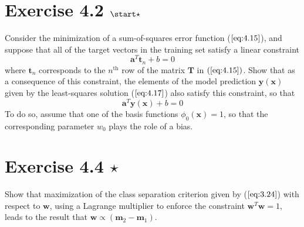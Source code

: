 \section*{Exercise 4.2 $\start \star$}
Consider the minimization of a sum-of-squares error
function ($\ref{eq:4.15}$), and suppose that all of the 
target vectors in the training set satisfy a linear constraint
\begin{equation}\label{eq:4.157}\tag{4.157}
    \mathbf{a}^T\mathbf{t}_n + b = 0
\end{equation}
where $\mathbf{t}_n$ corresponds to the $n^\text{th}$ row of the matrix $\mathbf{T}$
in $(\ref{eq:4.15})$. Show that as a consequence of this constraint,
the elements of the model prediction $\mathbf{y}(\mathbf{x})$ given
by the least-squares solution ($\ref{eq:4.17}$) also satisfy
this constraint, so that
\begin{equation}\label{eq:4.158}\tag{4.158}
    \mathbf{a}^T\mathbf{y}(\mathbf{x}) + b = 0
\end{equation}
To do so, assume that one of the basis functions $\phi_0(\mathbf{x}) = 1$,
so that the corresponding parameter $w_0$ plays the role of a bias.

\section*{Exercise 4.4 $\star$}
Show that maximization of the class separation criterion given by
($\ref{eq:3.24}$) with respect to $\mathbf{w}$, using a Lagrange multiplier
to enforce the constraint $\mathbf{w}^T\mathbf{w} = 1$, leads to the
result that $\mathbf{w} \propto (\mathbf{m}_2 - \mathbf{m}_1)$.

\vspace{1em}

